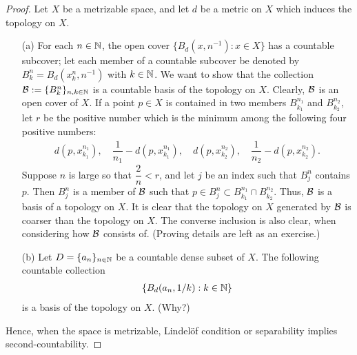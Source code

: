 \begin{proof}
    Let $X$ be a metrizable space, and let $d$ be a metric on $X$ which induces the topology on $X$.
    \begin{enumerate}
        \item[(a)]
        {
            For each $n\in{\mathbb{N}}$, the open cover $\{B_d\left(x, n^{-1}\right): x\in X\}$ has a countable subcover; let each member of a countable subcover be denoted by $B_k^n=B_d(x_k^n, n^{-1})$ with $k\in{\mathbb{N}}$.
            We want to show that the collection ${\mathcal{B}}:=\{B_k^n\}_{n, k\in{\mathbb{N}}}$ is a countable basis of the topology on $X$.
            Clearly, ${\mathcal{B}}$ is an open cover of $X$.
            If a point $p\in X$ is contained in two members $B_{k_1}^{n_1}$ and $B_{k_2}^{n_2}$, let $r$ be the positive number which is the minimum among the following four positive numbers:
            \begin{align*}
                d(p, x_{k_1}^{n_1}),\quad\dfrac{1}{n_1}-d(p, x_{k_1}^{n_1}),\quad d(p, x_{k_2}^{n_2}),\quad\dfrac{1}{n_2}-d(p, x_{k_2}^{n_2}).
            \end{align*}
            Suppose $n$ is large so that $\dfrac{2}{n}<r$, and let $j$ be an index such that $B_j^n$ contains $p$.
            Then $B_j^n$ is a member of ${\mathcal{B}}$ such that $p\in B_j^n\subset B_{k_1}^{n_1}\cap B_{k_2}^{n_2}$.
            Thus, ${\mathcal{B}}$ is a basis of a topology on $X$.
            It is clear that the topology on $X$ generated by ${\mathcal{B}}$ is coarser than the topology on $X$.
            The converse inclusion is also clear, when considering how ${\mathcal{B}}$ consists of. \color{brown}(Proving details are left as an exercise.)\color{brown}
        }
        \item[(b)]
        {
            Let $D=\{a_n\}_{n\in{\mathbb{N}}}$ be a countable dense subset of $X$.
            The following countable collection
            \begin{align*}
                \left\{B_d(a_n, 1/k): k\in{\mathbb{N}}\right\}
            \end{align*}
            is a basis of the topology on $X$. \color{brown}(Why?)\color{black}
        }
    \end{enumerate}
    Hence, when the space is metrizable, Lindel\"{o}f condition or separability implies second-countability.
\end{proof}


